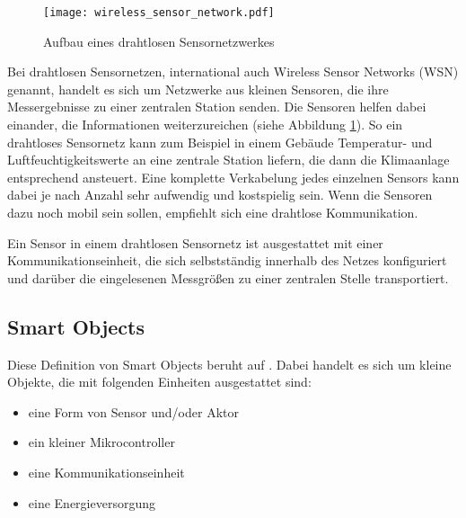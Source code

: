 \begin{figure}[htbp]
	\centering
	\texttt{[image: wireless\_sensor\_network.pdf]}
	\caption{Aufbau eines drahtlosen Sensornetzwerkes}
	\label{fig:wsn}
\end{figure}

Bei drahtlosen Sensornetzen, international auch Wireless Sensor Networks (WSN) genannt, handelt es sich um Netzwerke aus kleinen Sensoren, die ihre Messergebnisse zu einer zentralen Station senden. Die Sensoren helfen dabei einander, die Informationen weiterzureichen (siehe Abbildung \ref{fig:wsn}). So ein drahtloses Sensornetz kann zum Beispiel in einem Gebäude Temperatur- und Luftfeuchtigkeitswerte an eine zentrale Station liefern, die dann die Klimaanlage entsprechend ansteuert. Eine komplette Verkabelung jedes einzelnen Sensors kann dabei je nach Anzahl sehr aufwendig und kostspielig sein. Wenn die Sensoren dazu noch mobil sein sollen, empfiehlt sich eine drahtlose Kommunikation.

Ein Sensor in einem drahtlosen Sensornetz ist ausgestattet mit einer Kommunikationseinheit, die sich selbstständig innerhalb des Netzes konfiguriert und darüber die eingelesenen Messgrößen zu einer zentralen Stelle transportiert.


\subsection{Smart Objects}\label{Smart Objects}

Diese Definition von Smart Objects  beruht auf \textcite{vasseur10interconnecting}. Dabei handelt es sich um kleine Objekte, die mit folgenden Einheiten ausgestattet sind:

\begin{itemize}
	\itemsep 0pt
	\item eine Form von Sensor und/oder Aktor
	\item ein kleiner Mikrocontroller
	\item eine Kommunikationseinheit
	\item eine Energieversorgung
\end{itemize}

